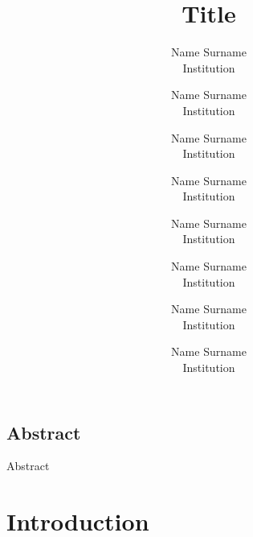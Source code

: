 \documentclass[letterpaper,twocolumn,10pt]{article}
\begin{document}
\date{}
\title{\Large \bf Title}

\author{
{\rm Name Surname}\\
Institution
\and
{\rm Name Surname}\\
Institution
\and
{\rm Name Surname}\\
Institution
\and
{\rm Name Surname}\\
Institution
\and
{\rm Name Surname}\\
Institution
\and
{\rm Name Surname}\\
Institution
\and
{\rm Name Surname}\\
Institution
\and
{\rm Name Surname}\\
Institution
} %

\maketitle



\subsection*{Abstract}
Abstract

\section{Introduction}
\label{sec:Introduction}


{\footnotesize 
}
\end{document}
